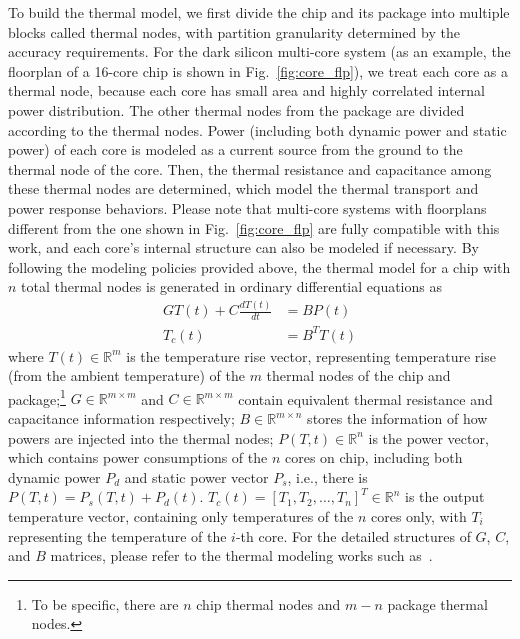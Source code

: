 To build the thermal model, we first divide the chip and its package
into multiple blocks called thermal nodes, with partition granularity
determined by the accuracy requirements. For the dark silicon
multi-core system (as an example, the floorplan of a 16-core chip is shown in
Fig.~\ref{fig:core_flp}), we treat each core as a thermal node,
because each core has small area and highly correlated internal power
distribution. The other thermal nodes from the package are divided
according to the thermal nodes. Power (including both dynamic power
and static power) of each core is modeled as a current source from the
ground to the thermal node of the core. Then, the thermal resistance
and capacitance among these thermal nodes are determined, which model
the thermal transport and power response behaviors. Please note that
multi-core systems with floorplans different from the one shown in
Fig.~\ref{fig:core_flp} are fully compatible with this work, and each
core's internal structure can also be modeled if necessary. By
following the modeling policies provided above, the thermal model for
a chip with $n$ total thermal nodes is generated in ordinary
differential equations as
\begin{equation}\label{eq:therm_model}
\begin{split}
GT(t) + C\frac{dT(t)}{dt} &= BP(t)\\
T_{c}(t) &= B^{T}T(t)
\end{split}
\end{equation}
where $T(t) \in \mathbb{R}^m$ is the temperature rise vector,
representing temperature rise (from the ambient temperature) of the $m$
thermal nodes of the chip and package;\footnote{To be specific, there are $n$ chip thermal
nodes and $m-n$ package thermal nodes.} $G \in \mathbb{R}^{m\times m}$
and  $C \in \mathbb{R}^{m \times m}$ contain equivalent thermal
resistance and capacitance information respectively; $B \in
\mathbb{R}^{m \times n}$ stores the information of how powers are
injected into the thermal nodes; $P(T, t) \in \mathbb{R}^{n}$ is the
power vector, which contains power consumptions of the $n$ cores on
chip, including both dynamic power $P_d$ and static power vector
$P_s$, i.e., there is $P(T, t)=P_s(T, t)+P_d(t)$. $T_{c}(t) = [T_1,
T_2, \ldots, T_n]^T \in
\mathbb{R}^n$ is the output temperature vector, containing only
temperatures of the $n$ cores only, with $T_i$ representing the
temperature of the $i$-th core. For the detailed structures of $G$, $C$,
and $B$ matrices, please refer to the thermal modeling works such
as~\cite{Huang:TVLSI'06,Huang:TC'08,WangTan:TODAES'13,Hanumaiah:TCAD'11}. 
